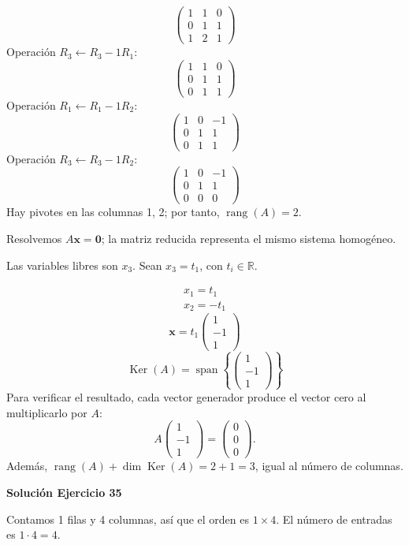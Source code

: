 \documentclass[12pt]{article}
\newcommand{\rang}{\operatorname{rang}}
\newcommand{\Ker}{\operatorname{Ker}}
\newcommand{\vect}[1]{\boldsymbol{#1}}
\begin{document}
\[
\begin{pmatrix}1&1&0\\0&1&1\\1&2&1\end{pmatrix}
\]
Operación $R_{3}\leftarrow R_{3}-1R_{1}$:
\[
\begin{pmatrix}1&1&0\\0&1&1\\0&1&1\end{pmatrix}
\]
Operación $R_{1}\leftarrow R_{1}-1R_{2}$:
\[
\begin{pmatrix}1&0&-1\\0&1&1\\0&1&1\end{pmatrix}
\]
Operación $R_{3}\leftarrow R_{3}-1R_{2}$:
\[
\begin{pmatrix}1&0&-1\\0&1&1\\0&0&0\end{pmatrix}
\]
Hay pivotes en las columnas 1, 2; por tanto, $\boxed{\rang(A)=2}$.

Resolvemos $A\vect x=\vect0$; la matriz reducida representa el mismo sistema homogéneo.

Las variables libres son $x_{3}$. Sean $x_{3}=t_{1}$, con $t_i\in\mathbb R$.

\[
\begin{aligned}x_{1}=t_{1}\\x_{2}=- t_{1}\end{aligned}
\]
\[
\vect x=t_{1}\begin{pmatrix}1\\-1\\1\end{pmatrix}
\]
\[
\boxed{\Ker(A)=\operatorname{span}\left\{\begin{pmatrix}1\\-1\\1\end{pmatrix}\right\}}
\]
Para verificar el resultado, cada vector generador produce el vector cero al multiplicarlo por $A$:
\[
A\begin{pmatrix}1\\-1\\1\end{pmatrix}=\begin{pmatrix}0\\0\\0\end{pmatrix}.
\]
Además, $\rang(A)+\dim\Ker(A)=2+1=3$, igual al número de columnas.


\par\bigskip\noindent\textbf{Solución Ejercicio 35}\par\nobreak
Contamos 1 filas y 4 columnas, así que el orden es $1\times4$. El número de entradas es $1\cdot 4=4$.
\end{document}

